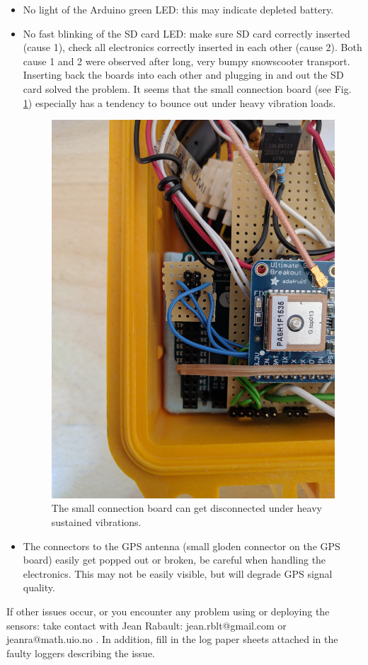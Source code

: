 \documentclass[pdftex,a4paper,12pt,twocolumn,fleqn,captions=tableheading]{scrartcl}
\begin{document}
\begin{itemize}
  \item No light of the Arduino green LED: this may indicate depleted battery.

  \item No fast blinking of the SD card LED: make sure SD card correctly inserted (cause 1), check all electronics correctly inserted in each other (cause 2). Both cause 1 and 2 were observed after long, very bumpy snowscooter transport. Inserting back the boards into each other and plugging in and out the SD card solved the problem. It seems that the small connection board (see Fig. \ref{smallBoard}) especially has a tendency to bounce out under heavy vibration loads.

  \begin{figure}
  \begin{center}
  \includegraphics[width=.4\textwidth]{Figures/IMG_20170418_140411}
  \caption{\label{smallBoard} The small connection board can get disconnected under heavy sustained vibrations.}
  \end{center}
  \end{figure}

  \item The connectors to the GPS antenna (small gloden connector on the GPS board) easily get popped out or broken, be careful when handling the electronics. This may not be easily visible, but will degrade GPS signal quality.

\end{itemize}

If other issues occur, or you encounter any problem using or deploying the sensors: take contact with Jean Rabault: jean.rblt@gmail.com or jeanra@math.uio.no . In addition, fill in the log paper sheets attached in the faulty loggers describing the issue.
\end{document}
